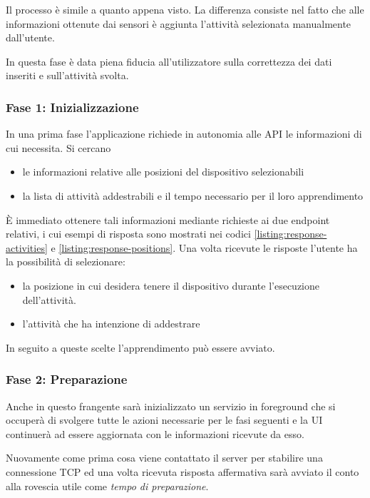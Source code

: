 \vspace{5mm} %

Il processo è simile a quanto appena visto. La differenza consiste nel fatto che alle informazioni ottenute dai sensori è 
aggiunta l'attività selezionata manualmente dall'utente.

\vspace{5mm} %

In questa fase è data piena fiducia all'utilizzatore sulla correttezza dei dati inseriti e sull'attività svolta.

\subsubsection{Fase 1: Inizializzazione}
In una prima fase l'applicazione richiede in autonomia alle API le informazioni di cui necessita. Si cercano
\begin{itemize}
    \item le informazioni relative alle posizioni del dispositivo selezionabili
    \item la lista di attività addestrabili e il tempo necessario per il loro apprendimento
\end{itemize}
È immediato ottenere tali informazioni mediante richieste ai due endpoint relativi, i cui esempi di risposta sono mostrati nei codici 
\ref{listing:response-activities} e \ref{listing:response-positions}.
Una volta ricevute le risposte l'utente ha la possibilità di selezionare: 
\begin{itemize}
    \item la posizione in cui desidera tenere il dispositivo durante l'esecuzione dell'attività.
    \item l'attività che ha intenzione di addestrare
\end{itemize}
In seguito a queste scelte l'apprendimento può essere avviato.

\subsubsection{Fase 2: Preparazione}
Anche in questo frangente sarà inizializzato un servizio in foreground \cite{services} che si occuperà di svolgere 
tutte le azioni necessarie per le fasi seguenti e la UI continuerà ad essere aggiornata con le informazioni ricevute da esso.

Nuovamente come prima cosa viene contattato il server per stabilire una connessione TCP ed una volta ricevuta risposta affermativa
sarà avviato il conto alla rovescia utile come \textit{tempo di preparazione}.

